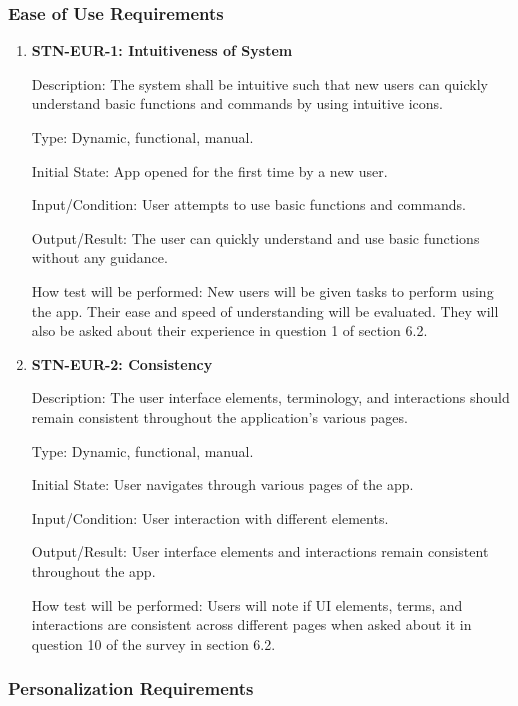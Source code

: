 \documentclass[12pt, titlepage]{article}
\begin{document}
\subsubsection{Ease of Use Requirements}

\begin{enumerate}

\item{\textbf{STN-EUR-1: Intuitiveness of System}}

Description: The system shall be intuitive such that new users can quickly understand basic functions and commands by using intuitive icons.

Type: Dynamic, functional, manual.

Initial State: App opened for the first time by a new user.

Input/Condition: User attempts to use basic functions and commands.

Output/Result: The user can quickly understand and use basic functions without any guidance.

How test will be performed: New users will be given tasks to perform using the app. Their ease and speed of understanding will be evaluated. They will also be asked about their experience in question 1 of section 6.2. 


\item{\textbf{STN-EUR-2: Consistency}}

Description: The user interface elements, terminology, and interactions should remain consistent throughout the application’s various pages.

Type: Dynamic, functional, manual.

Initial State: User navigates through various pages of the app.

Input/Condition: User interaction with different elements.

Output/Result: User interface elements and interactions remain consistent throughout the app.

How test will be performed: Users will note if UI elements, terms, and interactions are consistent across different pages when asked about it in question 10 of the survey in section 6.2. 
\end{enumerate}


\subsubsection{Personalization Requirements}
\end{document}
